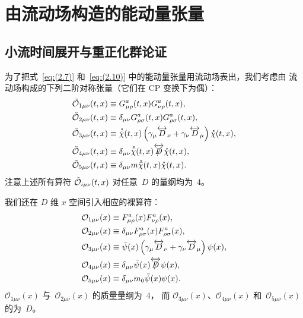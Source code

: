 \section{由流动场构造的能动量张量}
\label{sec:4}
\subsection{小流时间展开与重正化群论证}
为了把式~\eqref{eq:(2.7)} 和~\eqref{eq:(2.10)} 中的能动量张量用流动场表出，我们考虑由
流动场构成的下列二阶对称张量（它们在 CP 变换下为偶）：
\begin{align}
   \Tilde{\mathcal{O}}_{1\mu\nu}(t,x)&\equiv
   G_{\mu\rho}^a(t,x)G_{\nu\rho}^a(t,x),
\label{eq:(4.1)}\\
   \Tilde{\mathcal{O}}_{2\mu\nu}(t,x)&\equiv
   \delta_{\mu\nu}G_{\rho\sigma}^a(t,x)G_{\rho\sigma}^a(t,x),
\label{eq:(4.2)}\\
   \Tilde{\mathcal{O}}_{3\mu\nu}(t,x)&\equiv
   \mathring{\Bar{\chi}}(t,x)
   \left(\gamma_\mu\overleftrightarrow{D}_\nu
   +\gamma_\nu\overleftrightarrow{D}_\mu\right)
   \mathring{\chi}(t,x),
\label{eq:(4.3)}\\
   \Tilde{\mathcal{O}}_{4\mu\nu}(t,x)&\equiv
   \delta_{\mu\nu}
   \mathring{\Bar{\chi}}(t,x)
   \overleftrightarrow{\Slash{D}}
   \mathring{\chi}(t,x),
\label{eq:(4.4)}\\
   \Tilde{\mathcal{O}}_{5\mu\nu}(t,x)&\equiv
   \delta_{\mu\nu}
   m\mathring{\Bar{\chi}}(t,x)
   \mathring{\chi}(t,x).
\label{eq:(4.5)}
\end{align}
注意上述所有算符 $\Tilde{\mathcal{O}}_{i\mu\nu}(t,x)$ 对任意~$D$ 的量纲均为~$4$。

我们还在 $D$ 维 $x$ 空间引入相应的裸算符：
\begin{align}
   \mathcal{O}_{1\mu\nu}(x)&\equiv
   F_{\mu\rho}^a(x)F_{\nu\rho}^a(x),
\label{eq:(4.6)}\\
   \mathcal{O}_{2\mu\nu}(x)&\equiv
   \delta_{\mu\nu}F_{\rho\sigma}^a(x)F_{\rho\sigma}^a(x),
\label{eq:(4.7)}\\
   \mathcal{O}_{3\mu\nu}(x)&\equiv
   \Bar{\psi}(x)
   \left(\gamma_\mu\overleftrightarrow{D}_\nu
   +\gamma_\nu\overleftrightarrow{D}_\mu\right)
   \psi(x),
\label{eq:(4.8)}\\
   \mathcal{O}_{4\mu\nu}(x)&\equiv
   \delta_{\mu\nu}
   \Bar{\psi}(x)
   \overleftrightarrow{\Slash{D}}
   \psi(x),
\label{eq:(4.9)}\\
   \mathcal{O}_{5\mu\nu}(x)&\equiv
   \delta_{\mu\nu}
   m_0\Bar{\psi}(x)
   \psi(x).
\label{eq:(4.10)}
\end{align}
$\mathcal{O}_{1\mu\nu}(x)$ 与~$\mathcal{O}_{2\mu\nu}(x)$ 的质量量纲为~$4$，
而 $\mathcal{O}_{3\mu\nu}(x)$、$\mathcal{O}_{4\mu\nu}(x)$
和~$\mathcal{O}_{5\mu\nu}(x)$ 的为~$D$。

